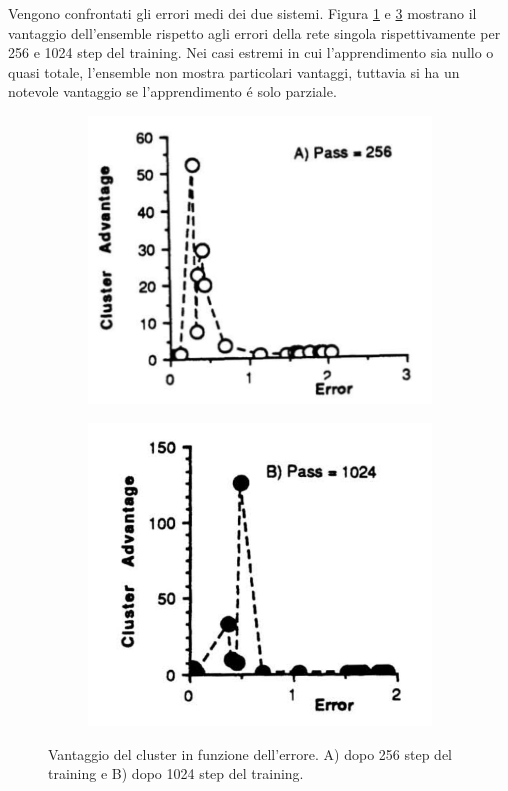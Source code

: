 \documentclass[a4paper,10pt]{article}
\begin{document}
 
 Vengono confrontati gli errori medi dei due sistemi.  Figura \ref{EnsembleAdvantageapng} e \ref{EnsembleAdvantagebpng} mostrano il vantaggio dell'ensemble rispetto agli errori della rete singola rispettivamente per 256 e 1024 step del training. Nei casi estremi in cui l'apprendimento sia nullo o quasi totale, l'ensemble non mostra particolari vantaggi, tuttavia si ha un notevole vantaggio se l'apprendimento \'e solo parziale.
 
 \begin{figure}[h!]
  \centering
  \begin{subfigure}[b]{0.4\linewidth}
   \includegraphics[width=\linewidth]{ClusterErrora.png}
   \label{EnsembleAdvantageapng}
  \end{subfigure}
  \begin{subfigure}[b]{0.4\linewidth}
   \includegraphics[width=\linewidth]{ClusterErrorb.png}
   \label{EnsembleAdvantagebpng}
  \end{subfigure}
  \caption{Vantaggio del cluster in funzione dell'errore. A) dopo 256 step del training e B) dopo 1024 step del training.}
 \end{figure}
 
\end{document}
